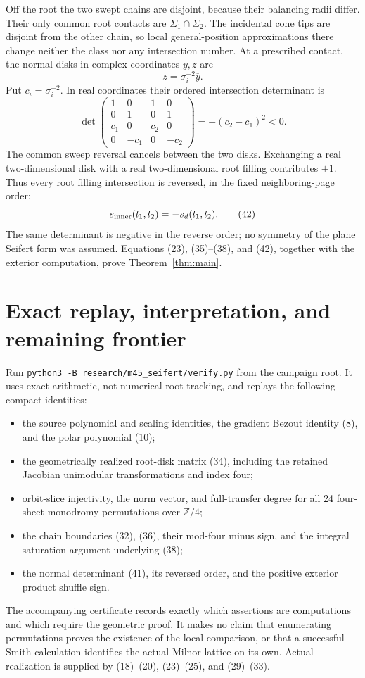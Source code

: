 \documentclass[11pt]{article}
\newcommand{\Z}{\mathbb Z}
\begin{document}
Off the root the two swept chains are disjoint, because
their balancing radii differ. Their only common root
contacts are \(\Sigma_1\cap\Sigma_2\).
The incidental cone tips are disjoint from the other
chain, so local general-position approximations there
change neither the class nor any intersection number.
At a prescribed contact, the normal disks in complex
coordinates \(y,z\) are
\[
                         z=\sigma_i^{-2}\overline y.
\]
Put \(c_i=\sigma_i^{-2}\). In real coordinates their
ordered intersection determinant is
\[
 \det\begin{pmatrix}
 1&0&1&0\\0&1&0&1\\c_1&0&c_2&0\\0&-c_1&0&-c_2
 \end{pmatrix}
                    =-(c_2-c_1)^2<0.              \tag{41}
\]
The common sweep reversal cancels between the two disks.
Exchanging a real two-dimensional disk with a real
two-dimensional root filling contributes \(+1\).
Thus every root filling intersection is reversed, in
the fixed neighboring-page order:
\[
                  s_{\rm inner}(l_1,l_2)=-s_d(l_1,l_2).            \tag{42}
\]
The same determinant is negative in the reverse order;
no symmetry of the plane Seifert form was assumed.
Equations (23), (35)--(38), and (42), together with the
exterior computation, prove Theorem~\ref{thm:main}.

\section{Exact replay, interpretation, and remaining frontier}

Run \texttt{python3 -B research/m45\_seifert/verify.py} from
the campaign root. It uses exact arithmetic, not numerical
root tracking, and replays the following compact identities:
\begin{itemize}
\item the source polynomial and scaling identities, the gradient
Bezout identity (8), and the polar polynomial (10);
\item the geometrically realized root-disk matrix (34), including
the retained Jacobian unimodular transformations and index four;
\item orbit-slice injectivity, the norm vector, and full-transfer
degree for all 24 four-sheet monodromy permutations over \(\Z/4\);
\item the chain boundaries (32), (36), their mod-four minus sign,
and the integral saturation argument underlying (38);
\item the normal determinant (41), its reversed order, and the
positive exterior product shuffle sign.
\end{itemize}
The accompanying certificate records exactly which assertions are
computations and which require the geometric proof. It makes no
claim that enumerating permutations proves the existence of the
local comparison, or that a successful Smith calculation identifies
the actual Milnor lattice on its own. Actual realization is supplied
by (18)--(20), (23)--(25), and (29)--(33).
\end{document}
